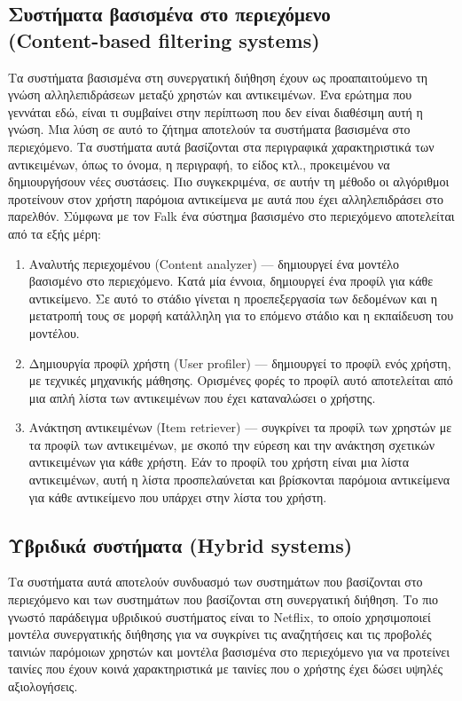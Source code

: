 \subsection{Συστήματα βασισμένα στο περιεχόμενο\\ (Content-based filtering systems)}
\noindent Τα συστήματα βασισμένα στη συνεργατική διήθηση έχουν ως προαπαιτούμενο τη γνώση αλληλεπιδράσεων μεταξύ χρηστών και αντικειμένων. Ένα ερώτημα που γεννάται εδώ, είναι τι συμβαίνει στην περίπτωση που δεν είναι διαθέσιμη αυτή η γνώση. Μια λύση σε αυτό το ζήτημα αποτελούν τα συστήματα βασισμένα στο περιεχόμενο. Τα συστήματα αυτά βασίζονται στα περιγραφικά χαρακτηριστικά των αντικειμένων, όπως το όνομα, η περιγραφή, το είδος κτλ., προκειμένου να δημιουργήσουν νέες συστάσεις. Πιο συγκεκριμένα, σε αυτήν τη μέθοδο οι αλγόριθμοι προτείνουν στον χρήστη παρόμοια αντικείμενα με αυτά που έχει αλληλεπιδράσει στο παρελθόν. Σύμφωνα με τον Falk \cite{falkPracticalRecommenderSystems2019} ένα σύστημα βασισμένο στο περιεχόμενο αποτελείται από τα εξής μέρη:
\begin{enumerate}
	\item Αναλυτής περιεχομένου (Content analyzer) — δημιουργεί ένα μοντέλο βασισμένο στο περιεχόμενο. Κατά μία έννοια, δημιουργεί ένα προφίλ για κάθε αντικείμενο. Σε αυτό το στάδιο γίνεται η προεπεξεργασία των δεδομένων και η μετατροπή τους σε μορφή κατάλληλη για το επόμενο στάδιο και η εκπαίδευση του μοντέλου.
	\item	Δημιουργία προφίλ χρήστη (User profiler) — δημιουργεί το προφίλ ενός χρήστη, με τεχνικές μηχανικής μάθησης. Ορισμένες φορές το προφίλ αυτό αποτελείται από μια απλή λίστα των αντικειμένων που έχει καταναλώσει ο χρήστης.
	\item	Ανάκτηση αντικειμένων (Item retriever) — συγκρίνει τα προφίλ των χρηστών με τα προφίλ των αντικειμένων, με σκοπό την εύρεση και την ανάκτηση σχετικών αντικειμένων για κάθε χρήστη. Εάν το προφίλ του χρήστη είναι μια λίστα αντικειμένων, αυτή η λίστα προσπελαύνεται και βρίσκονται παρόμοια αντικείμενα για κάθε αντικείμενο που υπάρχει στην λίστα του χρήστη. 
\end{enumerate}

\subsection{Υβριδικά συστήματα (Hybrid systems)}
\noindent Τα συστήματα αυτά αποτελούν συνδυασμό των συστημάτων που βασίζονται στο περιεχόμενο και των συστημάτων που βασίζονται στη συνεργατική διήθηση. Το πιο γνωστό παράδειγμα υβριδικού συστήματος είναι το Netflix, το οποίο χρησιμοποιεί μοντέλα συνεργατικής διήθησης για να συγκρίνει τις αναζητήσεις και τις προβολές ταινιών παρόμοιων χρηστών και μοντέλα βασισμένα στο περιεχόμενο για να προτείνει ταινίες που έχουν κοινά χαρακτηριστικά με ταινίες που ο χρήστης έχει δώσει υψηλές αξιολογήσεις.

